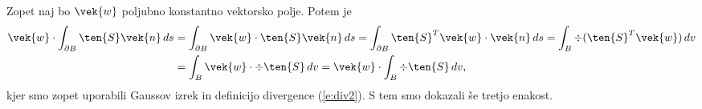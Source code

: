 	Zopet naj bo $\vek{w}$ poljubno konstantno vektorsko polje. Potem je
	\begin{align*}
		\vek{w}\cdot\int_{\partial B}\ten{S}\vek{n}\,ds &= \int_{\partial B}\vek{w}\cdot\ten{S}\vek{n}\,ds=
		\int_{\partial B}\ten{S}^T\vek{w}\cdot\vek{n}\,ds=
		\int_{B}\div(\ten{S}^T\vek{w})\,dv \\ &=\int_{B}\vek{w}\cdot\div\ten{S}\,dv=
		\vek{w}\cdot\int_{B}\div\ten{S}\,dv,
	\end{align*}
	kjer smo zopet uporabili Gaussov izrek in definicijo divergence (\ref{e:div2}). S tem smo dokazali še tretjo enakost.
\endproof